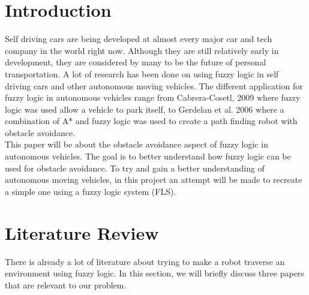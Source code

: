 \documentclass[conference]{IEEEtran}
\begin{document}
\section{Introduction}
Self driving cars are being developed at almost every major car and tech company in the world right now. Although they are still relatively early in development, they are considered by many to be the future of personal transportation. A lot of research has been done on using fuzzy logic in self driving cars and other autonomous moving vehicles. The different application for fuzzy logic in autonomous vehicles range from Cabrera-Cosetl, 2009 \cite{Cabrera2009} where fuzzy logic was used allow a vehicle to park itself, to Gerdelan et al. 2006 \cite{gerdelan2006novel} where a combination of A* and fuzzy logic was used to create a path finding robot with obstacle avoidance.\\

This paper will be about the obstacle avoidance aspect of fuzzy logic in autonomous vehicles. The goal is to better understand how fuzzy logic can be used for obstacle avoidance. To try and gain a better understanding of autonomous moving vehicles, in this project an attempt will be made to recreate a simple one using a fuzzy logic system (FLS).\\

\section{Literature Review}
There is already a lot of literature about trying to make a robot traverse an environment using fuzzy logic. In this section, we will briefly discuss three papers that are relevant to our problem.
\end{document}

